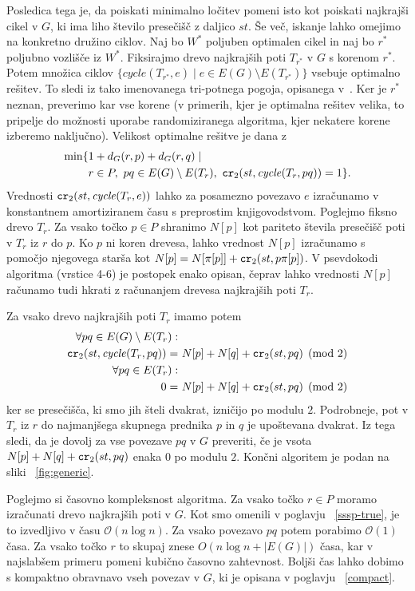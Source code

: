 \documentclass[a4paper, 12pt]{book}
\newcommand{\OO}{\ensuremath{\mathcal{O}}} %
\newcommand{\cycle}{\mathit{cycle}}
\newcommand\CR{\mbox{\tt cr}_2}		  %
\begin{document}
Posledica tega je, da poiskati minimalno ločitev pomeni isto kot poiskati najkrajši cikel v $G$, ki ima liho število presečišč z daljico $st$. Še več, iskanje lahko omejimo na konkretno družino ciklov. Naj bo $W^*$ poljuben optimalen cikel in naj bo $r^*$ poljubno vozlišče iz $W^*$. Fiksirajmo drevo najkrajših poti $T_{r^*}$ v $G$ s korenom $r^*$. Potem množica ciklov $\{ \cycle(T_{r^*},e)\mid e\in E(G)\setminus E(T_{r^*})\}$ vsebuje optimalno rešitev. To sledi iz tako imenovanega tri-potnega pogoja, opisanega v~\cite{CG16}. Ker   je $r^*$ neznan, preverimo kar vse korene (v primerih, kjer je optimalna rešitev velika, to pripelje do možnosti uporabe randomiziranega algoritma, kjer nekatere korene izberemo naključno). Velikost optimalne rešitve je dana z
\begin{align*}
\min \{& 1+d_G(r,p)+d_G(r,q) \mid \\
	   & r\in P,~ pq\in E(G)\setminus E(T_r),~
		\CR(st,\cycle(T_{r},pq))=1 \} .
\end{align*}
Vrednosti $\CR (st, \cycle(T_r,e))$ lahko za posamezno povezavo $e$ izračunamo v konstantnem amortiziranem času s preprostim knjigovodstvom.  Poglejmo fiksno drevo $T_r$. Za vsako točko $p\in P$ shranimo $N[p]$ kot pariteto števila presečišč poti v $T_r$ iz $r$ do $p$. Ko $p$ ni koren drevesa, lahko vrednost $N[p]$ izračunamo s pomočjo njegovega starša kot $N[p]=N[\pi[p]]+\CR(st,p\pi[p])$. V psevdokodi algoritma (vrstice 4-6) je  postopek enako opisan, čeprav lahko vrednosti $N[p]$ računamo tudi hkrati z računanjem drevesa najkrajših poti $T_r$.

Za vsako drevo najkrajših poti $T_r$ imamo potem 
\begin{align*}
	\forall pq\in E(G)\setminus E(T_r):&\\
	\CR (st, \cycle(T_r,pq)) =&~N[p]+N[q]+\CR(st,pq) \pmod 2\\
	\forall pq\in E(T_r):&\\
	0 =&~N[p]+N[q]+\CR(st,pq) \pmod 2
\end{align*}
ker se presečišča, ki smo jih šteli dvakrat, izničijo po modulu $2$. Podrobneje, pot v $T_r$ iz $r$ do najmanjšega skupnega prednika $p$ in $q$ je upoštevana dvakrat. Iz tega sledi, da je dovolj za vse povezave $pq$ v $G$ preveriti, če je vsota $N[p]+N[q]+\CR(st,pq)$ enaka $0$ po modulu $2$. Končni algoritem je podan na sliki ~\ref{fig:generic}.

Poglejmo si časovno kompleksnost algoritma. Za vsako točko $r\in P$ moramo izračunati drevo najkrajših poti v $G$. Kot smo omenili v poglavju ~\ref{sssp-true}, je to izvedljivo v času $\OO(n\log n)$. Za vsako povezavo $pq$ potem porabimo $\OO(1)$ časa. Za vsako točko $r$ to skupaj znese $O(n\log n+|E(G)|)$ časa, kar v najslabšem primeru pomeni kubično časovno zahtevnost. Boljši čas lahko dobimo s kompaktno obravnavo vseh povezav v $G$, ki je opisana v poglavju ~\ref{compact}.  
\end{document}
